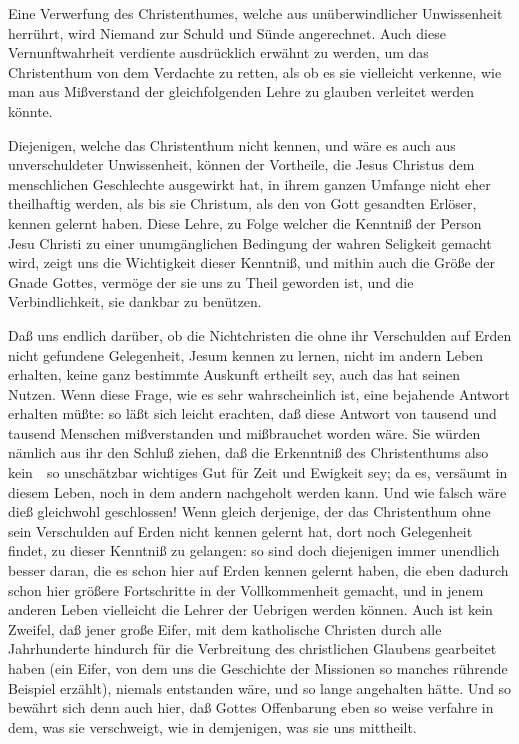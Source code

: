\begin{aufza}
\begin{aufzb}
\begin{aufzc}
\end{aufzc}
\item Eine Verwerfung des Christenthumes, welche aus unüberwindlicher Unwissenheit herrührt, wird Niemand zur Schuld und Sünde angerechnet. Auch diese Vernunftwahrheit verdiente ausdrücklich erwähnt zu werden, um das Christenthum von dem Verdachte zu retten, als ob es sie vielleicht verkenne, wie man aus Mißverstand der gleichfolgenden Lehre zu glauben verleitet werden könnte.
\item Diejenigen, welche das Christenthum nicht kennen, und wäre es auch aus unverschuldeter Unwissenheit, können der Vortheile, die Jesus Christus dem menschlichen Geschlechte ausgewirkt hat, in ihrem ganzen Umfange nicht eher theilhaftig werden, als bis sie Christum, als den von Gott gesandten Erlöser, kennen gelernt haben. Diese Lehre, zu Folge welcher die Kenntniß der Person Jesu Christi zu einer unumgänglichen Bedingung der wahren Seligkeit gemacht wird, zeigt uns die Wichtigkeit dieser Kenntniß, und mithin auch die Größe der Gnade Gottes, vermöge der sie uns zu Theil geworden ist, und die Verbindlichkeit, sie dankbar zu benützen.
\item Daß uns endlich darüber, ob die Nichtchristen die ohne ihr Verschulden auf Erden nicht gefundene Gelegenheit, Jesum kennen zu lernen, nicht im andern Leben erhalten, keine ganz bestimmte Auskunft ertheilt sey, auch das hat seinen Nutzen. Wenn diese Frage, wie es sehr wahrscheinlich ist, eine bejahende Antwort erhalten müßte: so läßt sich leicht erachten, daß diese Antwort von tausend und tausend Menschen mißverstanden und mißbrauchet worden wäre. Sie würden nämlich aus ihr den Schluß ziehen, daß die Erkenntniß des Christenthums also kein~\ so unschätzbar wichtiges Gut für Zeit und Ewigkeit sey; da es, versäumt in diesem Leben, noch in dem andern nachgeholt werden kann. Und wie falsch wäre dieß gleichwohl geschlossen! Wenn gleich derjenige, der das Christenthum ohne sein Verschulden auf Erden nicht kennen gelernt hat, dort noch Gelegenheit findet, zu dieser Kenntniß zu gelangen: so sind doch diejenigen immer unendlich besser daran, die es schon hier auf Erden kennen gelernt haben, die eben dadurch schon hier größere Fortschritte in der Vollkommenheit gemacht, und in jenem anderen Leben vielleicht die Lehrer der Uebrigen werden können. Auch ist kein Zweifel, daß jener große Eifer, mit dem katholische Christen durch alle Jahrhunderte hindurch für die Verbreitung des christlichen Glaubens gearbeitet haben (ein Eifer, von dem uns die Geschichte der Missionen so manches rührende Beispiel erzählt), niemals entstanden wäre, und so lange angehalten hätte. Und so bewährt sich denn auch hier, daß Gottes Offenbarung eben so weise verfahre in dem, was sie verschweigt, wie in demjenigen, was sie uns mittheilt.~
\end{aufzb}
\end{aufza}

